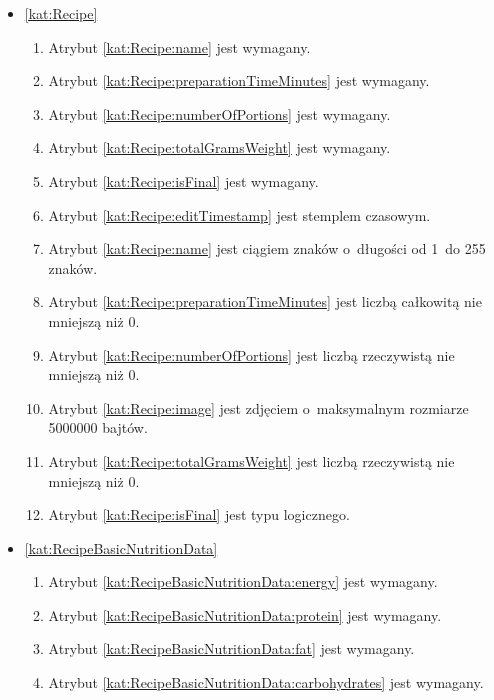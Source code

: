 \begin{itemize}[label={\textbf{Ograniczenia dla}}, wide, labelwidth=!, labelindent=0pt]
    \setlength\itemsep{1.75em}
    \item\ref{kat:Recipe}\mynobreakpar
    \begin{enumerate}[label={\textbf{OGR/3/\protect\twodigits{\arabic{enumi}}}}, wide, labelwidth=!, align=left, leftmargin=3cm]
        \item Atrybut \ref{kat:Recipe:name} jest wymagany.
        \item Atrybut \ref{kat:Recipe:preparationTimeMinutes} jest wymagany.
        \item Atrybut \ref{kat:Recipe:numberOfPortions} jest wymagany.
        \item Atrybut \ref{kat:Recipe:totalGramsWeight} jest wymagany.
        \item Atrybut \ref{kat:Recipe:isFinal} jest wymagany.

        \item Atrybut \ref{kat:Recipe:editTimestamp} jest stemplem czasowym.
        \item Atrybut \ref{kat:Recipe:name} jest ciągiem znaków o~długości od 1~do 255 znaków.
        \item Atrybut \ref{kat:Recipe:preparationTimeMinutes} jest liczbą całkowitą nie mniejszą niż 0.
        \item Atrybut \ref{kat:Recipe:numberOfPortions} jest liczbą rzeczywistą nie mniejszą niż 0.
        \item Atrybut \ref{kat:Recipe:image} jest zdjęciem o~maksymalnym rozmiarze 5000000 bajtów.
        \item Atrybut \ref{kat:Recipe:totalGramsWeight} jest liczbą rzeczywistą nie mniejszą niż 0.
        \item Atrybut \ref{kat:Recipe:isFinal} jest typu logicznego.
    \end{enumerate}

    \item\ref{kat:RecipeBasicNutritionData}\mynobreakpar
    \begin{enumerate}[label={\textbf{OGR/3/\protect\twodigits{\arabic{enumi}}}}, wide, labelwidth=!, align=left, leftmargin=3cm, resume]
        \item Atrybut \ref{kat:RecipeBasicNutritionData:energy} jest wymagany.
        \item Atrybut \ref{kat:RecipeBasicNutritionData:protein} jest wymagany.
        \item Atrybut \ref{kat:RecipeBasicNutritionData:fat} jest wymagany.
        \item Atrybut \ref{kat:RecipeBasicNutritionData:carbohydrates} jest wymagany.


\end{enumerate}
\end{itemize}
